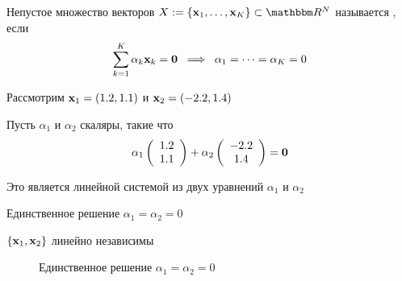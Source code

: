 \begin{frame}

    \vspace{2em}
   

    Непустое множество векторов $X := \{\boldx_1,\ldots, \boldx_K\}
    \subset \RR^N$ называется , если
    \begin{equation*}
        \sum_{k=1}^K \alpha_k {\mathbf x}_k
         = {\mathbf 0} 
        \; \implies \;
        \alpha_1 = \cdots = \alpha_K = 0
    \end{equation*}

    \vspace{1em}

\end{frame}


\begin{frame}
    
    \vspace{2em}
    \Eg 
    Рассмотрим ${\mathbf x}_1 = (1.2, 1.1)$ и ${\mathbf x}_2 = (-2.2, 1.4)$
    
    Пусть $\alpha_1$ и $\alpha_2$ скаляры, такие что
    \begin{equation*}
        \alpha_1
        \left(
        \begin{array}{c}
            1.2 \\
            1.1
        \end{array}
        \right)
        + 
        \alpha_2
        \left(
        \begin{array}{c}
            -2.2 \\
            1.4
        \end{array}
        \right)
        =
        {\mathbf 0}
    \end{equation*}
    
    Это является линейной системой из двух уравнений $\alpha_1$ и $\alpha_2$ 
    
    Единственное решение $\alpha_1 = \alpha_2 = 0$
    
    $\{{\mathbf x}_1, {\mathbf x}_2\}$ линейно независимы


\end{frame}

    \begin{frame}
        \begin{figure}
       \begin{center}
           \caption{\label{f:alpha_eq} Единственное решение $\alpha_1 = \alpha_2 = 0$}
       \end{center}
    \end{figure}

\end{frame}

